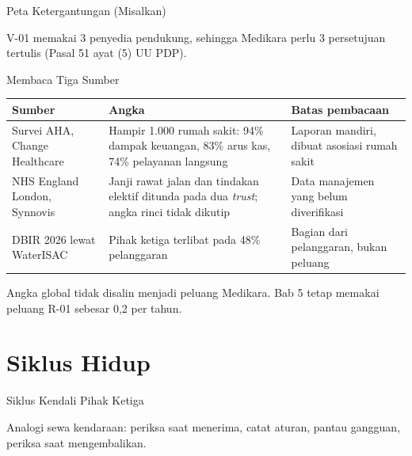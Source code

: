 \documentclass[aspectratio=169, table, 12pt]{beamer}
\begin{document}
\begin{frame}{{\Large Peta Ketergantungan (Misalkan)}}
  \vspace{2pt}
  \begin{center}
    \resizebox{0.76\textwidth}{!}{}
  \end{center}
  \footnotesize V-01 memakai 3 penyedia pendukung, sehingga Medikara perlu 3 persetujuan tertulis
  (Pasal 51 ayat (5) UU PDP).
\end{frame}

\begin{frame}{{\Large Membaca Tiga Sumber}}
  \vspace{2pt}
  \scriptsize
  \begin{tabularx}{\textwidth}{|>{\raggedright\arraybackslash}p{}|>{\raggedright\arraybackslash}X|>{\raggedright\arraybackslash}X|}
    \hline
    \textbf{Sumber} & \textbf{Angka} & \textbf{Batas pembacaan} \\ \hline
    Survei AHA, Change Healthcare & Hampir 1.000 rumah sakit: 94\% dampak keuangan, 83\% arus kas,
    74\% pelayanan langsung & Laporan mandiri, dibuat asosiasi rumah sakit \\ \hline
    NHS England London, Synnovis & Janji rawat jalan dan tindakan elektif ditunda pada dua
    \textit{trust}; angka rinci tidak dikutip & Data manajemen yang belum diverifikasi \\ \hline
    DBIR 2026 lewat WaterISAC & Pihak ketiga terlibat pada 48\% pelanggaran & Bagian dari
    pelanggaran, bukan peluang \\ \hline
  \end{tabularx}

  \vspace{8pt}
  \small Angka global tidak disalin menjadi peluang Medikara. Bab 5 tetap memakai peluang R-01
  sebesar 0,2 per tahun.
\end{frame}

\section{Siklus Hidup}

\begin{frame}{{\Large Siklus Kendali Pihak Ketiga}}
  \vspace{6pt}
  \begin{center}
    \resizebox{0.96\textwidth}{!}{}
  \end{center}
  \small Analogi sewa kendaraan: periksa saat menerima, catat aturan, pantau gangguan, periksa saat
  mengembalikan.
\end{frame}
\end{document}
